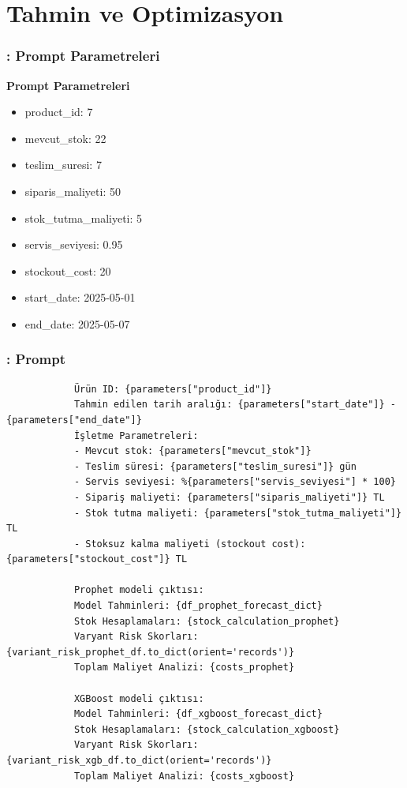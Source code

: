 \documentclass[12pt]{beamer}
\begin{document}
	
	\section{Tahmin ve Optimizasyon}
	\begin{frame}
		\frametitle{\insertsection: Prompt Parametreleri}
		\textbf{Prompt Parametreleri}
		\begin{itemize}
			\item product\_id: 7
			\item mevcut\_stok: 22
			\item teslim\_suresi: 7
			\item siparis\_maliyeti: 50
			\item stok\_tutma\_maliyeti: 5
			\item servis\_seviyesi: 0.95
			\item stockout\_cost: 20
			\item start\_date: 2025-05-01
			\item end\_date: 2025-05-07
		\end{itemize}
	\end{frame}
	
	\begin{frame}[fragile]
		\frametitle{\insertsection: Prompt}
		\scriptsize
		\begin{verbatim}
			Ürün ID: {parameters["product_id"]}
			Tahmin edilen tarih aralığı: {parameters["start_date"]} - {parameters["end_date"]}
			İşletme Parametreleri:
			- Mevcut stok: {parameters["mevcut_stok"]}
			- Teslim süresi: {parameters["teslim_suresi"]} gün
			- Servis seviyesi: %{parameters["servis_seviyesi"] * 100}
			- Sipariş maliyeti: {parameters["siparis_maliyeti"]} TL
			- Stok tutma maliyeti: {parameters["stok_tutma_maliyeti"]} TL
			- Stoksuz kalma maliyeti (stockout cost): {parameters["stockout_cost"]} TL
			
			Prophet modeli çıktısı:
			Model Tahminleri: {df_prophet_forecast_dict}
			Stok Hesaplamaları: {stock_calculation_prophet}
			Varyant Risk Skorları: {variant_risk_prophet_df.to_dict(orient='records')}
			Toplam Maliyet Analizi: {costs_prophet}
			
			XGBoost modeli çıktısı:
			Model Tahminleri: {df_xgboost_forecast_dict}
			Stok Hesaplamaları: {stock_calculation_xgboost}
			Varyant Risk Skorları: {variant_risk_xgb_df.to_dict(orient='records')}
			Toplam Maliyet Analizi: {costs_xgboost}
		\end{verbatim}
	\end{frame}
	
\end{document}
